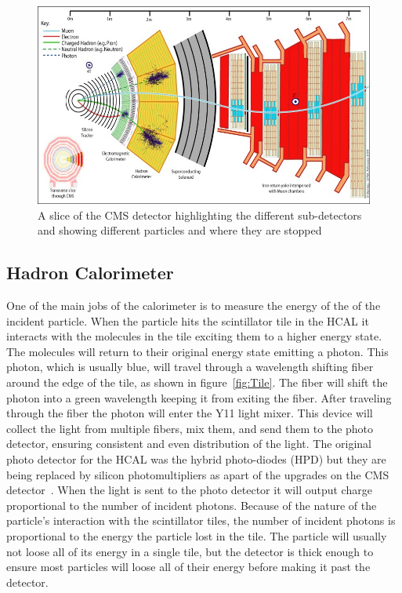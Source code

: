 \begin{figure}
\centering
\includegraphics[width=\linewidth]{Figures/CMSlayout.jpg}
\caption{A slice of the CMS detector highlighting the different sub-detectors and showing different particles and where they are stopped}
\label{fig:CMSlayout}
\end{figure}

\subsection{Hadron Calorimeter}
One of the main jobs of the calorimeter is to measure the energy of the of the incident particle. When the particle hits the scintillator tile in the HCAL it interacts with the molecules in the tile exciting them to a higher energy state. The molecules will return to their original energy state emitting a photon. This photon, which is usually blue, will travel through a wavelength shifting fiber around the edge of the tile, as shown in figure~\ref{fig:Tile}. The fiber will shift the photon into a green wavelength keeping it from exiting the fiber. After traveling through the fiber the photon will enter the Y11 light mixer. This device will collect the light from multiple fibers, mix them, and send them to the photo detector, ensuring consistent and even distribution of the light. The original photo detector for the HCAL was the hybrid photo-diodes (HPD) but they are being replaced by silicon photomultipliers as apart of the upgrades on the CMS detector~\cite{HCALPhase1}. When the light is sent to the photo detector it will output charge proportional to the number of incident photons. Because of the nature of the particle's interaction with the scintillator tiles, the number of incident photons is proportional to the energy the particle lost in the tile. The particle will usually not loose all of its energy in a single tile, but the detector is thick enough to ensure most particles will loose all of their energy before making it past the detector.

